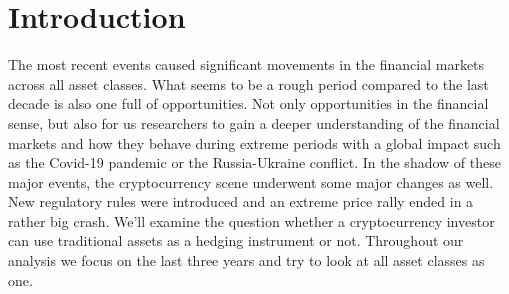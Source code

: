 \documentclass[11pt]{article}
\begin{document}
\titlepageindividualised
\thispagestyle{empty}
\doublespacing

\newpage
\setcounter{page}{1}
\thispagestyle{firststyle}


\newpage
{}

\listoffigures

\thispagestyle{firststyle}
 
\vspace{12px}

\thispagestyle{firststyle}
\listoftables


\newpage
\renewcommand{\contentsname}{Table of Contents}
\thispagestyle{firststyle}

\newpage
\tableofcontents

\newpage
{}
\setcounter{page}{1}
\section{Introduction} \label{sec:introduction}
The most recent events caused significant movements in the financial markets across all asset classes. What seems to be a rough period compared to the last decade is also one full of opportunities. Not only opportunities in the financial sense, but also for us researchers to gain a deeper understanding of the financial markets and how they behave during extreme periods with a global impact such as the Covid-19 pandemic or the Russia-Ukraine conflict. In the shadow of these major events, the cryptocurrency scene underwent some major changes as well. New regulatory rules were introduced and an extreme price rally ended in a rather big crash. 
We'll examine the question whether a cryptocurrency investor can use traditional assets as a hedging instrument or not. Throughout our analysis we focus on the last three years and try to look at all asset classes as one.



\vspace{2cm}


\begin{center}
\end{center}
\end{document}
